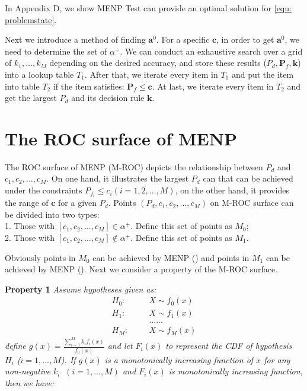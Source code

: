 \documentclass[12pt,journal,a4paper,twoside,onecolumn]{IEEEtran}
\newcommand{\rmnum}[1]{\romannumeral #1}
\begin{document}
\begin{spacing}{2.5}
In Appendix D, we show MENP Test can provide an optimal solution for \eqref{equ: problemstate}.

Next we introduce a method of finding $\mathbf{a}^0$. For a specific $\mathbf{c}$, in order to get $\mathbf{a}^0$, we need to determine the set of $\alpha^+$. We can conduct an exhaustive search over a grid of $k_1, ..., k_M$ depending on the desired accuracy, and store these results ($P_d, \mathbf{P}_f, \mathbf{k}$) into a lookup table $T_1$. After that, we iterate every item in $T_1$ and put the item into table $T_2$ if the item satisfies:  $\mathbf{P}_f \leq \mathbf{c}$.
At last, we iterate every item in $T_2$ and get the largest $P_d$ and its decision rule $\mathbf{k}$.

\section{The ROC surface of MENP}

The ROC surface of MENP (M-ROC) depicts the relationship between $P_d$ and $c_1, c_2, ..., c_M$. On one hand, it  illustrates the largest $P_d$ can that can be achieved under the constraints $P_{f_i} \leq c_i (i = 1, 2, ..., M)$, on the other hand, it provides the range of $\mathbf{c}$ for a given $P_d$.
Points $(P_d, c_1, c_2, ..., c_M)$ on M-ROC  surface can be divided into two types: 
\\1. Those with $[c_1, c_2, ..., c_M] \in \alpha^+$. Define this set of points as $M_0$; 
\\2. Those with $[c_1, c_2, ..., c_M] \notin \alpha^+$. Define this set of points as $M_1$. 

Obviously points in $M_0$ can be achieved by MENP (\rmnum{1}) and points in $M_1$ can  be achieved by MENP (\rmnum{2}). Next we consider a property of the M-ROC surface.

\noindent \textbf{Property 1}
\noindent \textit{
  \noindent Assume hypotheses given as:
}
\begin{equation}
\begin{split}
H_0:\;\;\;\;\;\;&X \sim f_0(x)\\
H_1:\;\;\;\;\;\;&X \sim f_1(x)\\
  &......\\
H_M:\;\;\;\;\;\;&X \sim f_M(x)
\end{split}
\end{equation}
\textit{
  define $g(x) = \frac{\sum_{i=1}^{M}k_if_i(x)}{f_0(x)}$ and let $F_i(x)$ to represent the CDF of hypothesis $H_i$ ($i = 1, ..., M$). If $g(x)$ is a monotonically increasing function of $x$ for any non-negative $k_i\;\;(i = 1, ..., M)$ and $F_i(x)$ is monotonically increasing function, then we have:}
  

\end{spacing}
\end{document}
